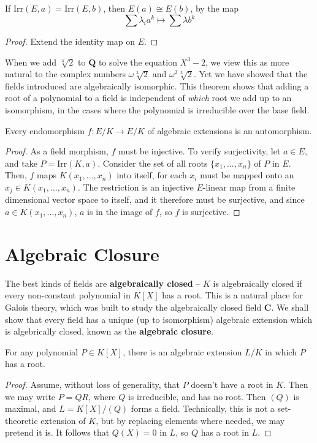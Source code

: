 \begin{corollary}
    If $\text{Irr}(E,a) = \text{Irr}(E,b)$, then $E(a) \cong E(b)$, by the map
    \[ \sum \lambda_i a^k \mapsto \sum \lambda b^k \]
\end{corollary}
\begin{proof}
    Extend the identity map on $E$.
\end{proof}

When we add $\sqrt[3]{2}$ to $\mathbf{Q}$ to solve the equation $X^3 - 2$, we view this as more natural to the complex numbers $\omega \sqrt[3]{2}$ and $\omega^2 \sqrt[3]{2}$. Yet we have showed that the fields introduced are algebraically isomorphic. This theorem shows that adding a root of a polynomial to a field is independent of {\it which} root we add up to an isomorphism, in the cases where the polynomial is irreducible over the base field.

\begin{corollary}
    Every endomorphism $f: E/K \to E/K$ of algebraic extensions is an automorphism.
\end{corollary}
\begin{proof}
    As a field morphism, $f$ must be injective. To verify surjectivity, let $a \in E$, and take $P = \text{Irr}(K,a)$. Consider the set of all roots $\{ x_1, \dots, x_n \}$ of $P$ in $E$. Then, $f$ maps $K(x_1, \dots, x_n)$ into itself, for each $x_i$ must be mapped onto an $x_j \in K(x_1, \dots, x_n)$. The restriction is an injective $E$-linear map from a finite dimensional vector space to itself, and it therefore must be surjective, and since $a \in K(x_1, \dots, x_n)$, $a$ is in the image of $f$, so $f$ is surjective.
\end{proof}

\section{Algebraic Closure}

The best kinds of fields are {\bf algebraically closed} -- $K$ is algebraically closed if every non-constant polynomial in $K[X]$ has a root. This is a natural place for Galois theory, which was built to study the algebraically closed field $\mathbf{C}$. We shall show that every field has a unique (up to isomorphism) algebraic extension which is algebrically closed, known as the {\bf algebraic closure}.

\begin{lemma}
    For any polynomial $P \in K[X]$, there is an algebraic extension $L/K$ in which $P$ has a root.
\end{lemma}
\begin{proof}
    Assume, without loss of generality, that $P$ doesn't have a root in $K$. Then we may write $P = QR$, where $Q$ is irreducible, and has no root. Then $(Q)$ is maximal, and $L = K[X]/(Q)$ forms a field. Technically, this is not a set-theoretic extension of $K$, but by replacing elements where needed, we may pretend it is. It follows that $Q(X) = 0$ in $L$, so $Q$ has a root in $L$.
\end{proof}

